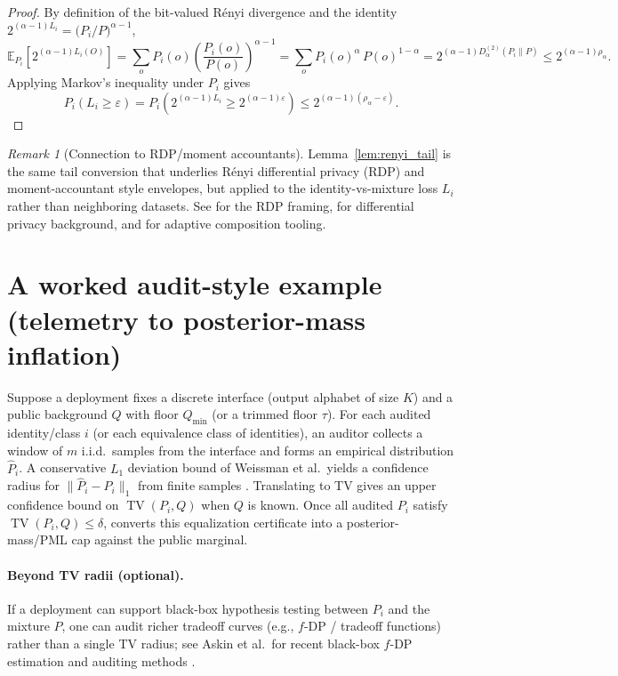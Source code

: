 \documentclass[11pt]{article}
\newcommand{\EE}{\mathbb{E}}
\DeclareMathOperator{\TV}{TV}
\theoremstyle{definition}
\theoremstyle{remark}
\newtheorem{remark}{Remark}
\begin{document}
\begin{proof}
By definition of the bit-valued R\'enyi divergence and the identity $2^{(\alpha-1)L_i}=\bigl(P_i/P\bigr)^{\alpha-1}$,
\[
\EE_{P_i}\!\left[2^{(\alpha-1)L_i(O)}\right]
=\sum_o P_i(o)\left(\frac{P_i(o)}{P(o)}\right)^{\alpha-1}
=\sum_o P_i(o)^{\alpha}\,P(o)^{1-\alpha}
=2^{(\alpha-1)D_\alpha^{(2)}(P_i\|P)}
\le 2^{(\alpha-1)\rho_\alpha}.
\]
Applying Markov's inequality under $P_i$ gives
\[
P_i(L_i\ge \varepsilon)=P_i\!\left(2^{(\alpha-1)L_i}\ge 2^{(\alpha-1)\varepsilon}\right)
\le 2^{(\alpha-1)(\rho_\alpha-\varepsilon)}.
\]
\end{proof}

\begin{remark}[Connection to RDP/moment accountants]
Lemma~\ref{lem:renyi_tail} is the same tail conversion that underlies R\'enyi differential privacy (RDP) and moment-accountant style envelopes, but applied to the identity-vs-mixture loss $L_i$ rather than neighboring datasets.
See \cite{MironovRDP2017} for the RDP framing, \cite{DworkRoth2014} for differential privacy background, and \cite{RogersOdometers2016} for adaptive composition tooling.
\end{remark}

\section{A worked audit-style example (telemetry to posterior-mass inflation)}\label{sec:worked_example}
Suppose a deployment fixes a discrete interface (output alphabet of size $K$) and a public background $Q$ with floor $Q_{\min}$ (or a trimmed floor $\tau$).
For each audited identity/class $i$ (or each equivalence class of identities), an auditor collects a window of $m$ i.i.d.\ samples from the interface and forms an empirical distribution $\widehat P_i$.
A conservative $L_1$ deviation bound of Weissman et al.\ yields a confidence radius for $\|\widehat P_i-P_i\|_1$ from finite samples \cite{Weissman2003L1}.
Translating to TV gives an upper confidence bound on $\TV(P_i,Q)$ when $Q$ is known.
Once all audited $P_i$ satisfy $\TV(P_i,Q)\le\delta$,  converts this equalization certificate into a posterior-mass/PML cap against the public marginal.

\paragraph{Beyond TV radii (optional).}
If a deployment can support black-box hypothesis testing between $P_i$ and the mixture $P$, one can audit richer tradeoff curves (e.g., $f$-DP / tradeoff functions) rather than a single TV radius; see Askin et al.\ for recent black-box $f$-DP estimation and auditing methods \cite{AskinUSENIXSecurity2025}.
\end{document}
